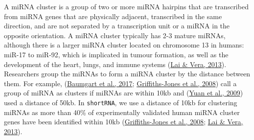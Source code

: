 \documentclass[12pt,twoside]{reedthesis}
\begin{document}
A miRNA cluster is a group of two or more miRNA hairpins that are
transcribed from miRNA genes that are physically adjacent, transcribed
in the same direction, and are not separated by a transcription unit or
a miRNA in the opposite orientation. A miRNA cluster typically has 2-3 mature miRNAs, although there is a larger miRNA cluster located on chromosome 13 in humans: miR-17 to miR-92, which is implicated in tumour formation, as well as the development of the heart, lungs, and immune systems (\protect\hyperlink{ref-lai2013}{Lai \& Vera, 2013}). Researchers group the miRNAs to form a miRNA cluster by the
distance between them. For example, (\protect\hyperlink{ref-baumgart2017}{Baumgart et al., 2017}; \protect\hyperlink{ref-griffiths-jones2008}{Griffiths-Jones et al., 2008}) call a group of miRNA as clusters if miRNAs are within
10kb and (\protect\hyperlink{ref-yuan2009}{Yuan et al., 2009}) used a distance of 50kb. In \texttt{shortRNA}, we use a
distance of 10kb for clustering miRNAs as more than 40\% of
experimentally validated human miRNA cluster genes have been identified
within 10kb (\protect\hyperlink{ref-griffiths-jones2008}{Griffiths-Jones et al., 2008}; \protect\hyperlink{ref-lai2013}{Lai \& Vera, 2013}).
\end{document}
